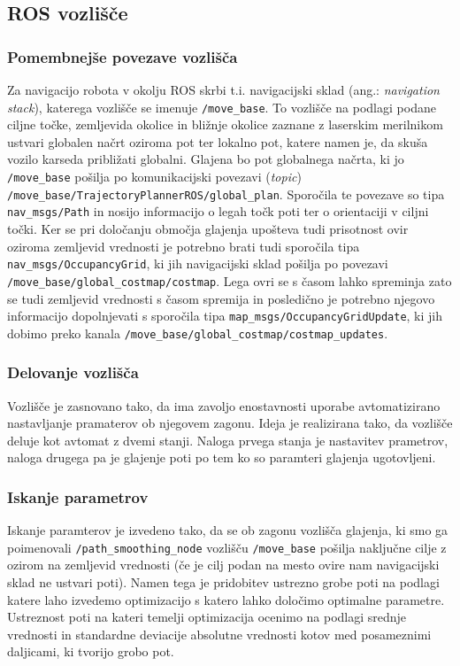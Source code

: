 \documentclass[10pt,a4paper]{article}
\begin{document}
\subsection{ROS vozlišče}

\subsubsection{Pomembnejše povezave vozlišča}


Za navigacijo robota v okolju ROS skrbi t.i. navigacijski sklad (ang.: \textit{navigation stack}), katerega vozlišče se imenuje \verb|/move_base|. To vozlišče na podlagi podane ciljne točke, zemljevida okolice in bližnje okolice zaznane z laserskim merilnikom ustvari globalen načrt oziroma pot ter lokalno pot, katere namen je, da skuša vozilo karseda približati globalni. Glajena bo pot globalnega načrta, ki jo \verb|/move_base| pošilja po komunikacijski povezavi (\textit{topic}) \verb|/move_base/TrajectoryPlannerROS/global_plan|. Sporočila te povezave so tipa \verb|nav_msgs/Path| in nosijo informacijo o legah točk poti ter o orientaciji v ciljni točki. Ker se pri določanju območja glajenja upošteva tudi prisotnost ovir oziroma zemljevid vrednosti je potrebno brati tudi sporočila tipa \verb|nav_msgs/OccupancyGrid|, ki jih navigacijski sklad pošilja po povezavi \verb|/move_base/global_costmap/costmap|. Lega ovri se s časom lahko spreminja zato se tudi zemljevid vrednosti s časom spremija in posledično je potrebno njegovo informacijo dopolnjevati s sporočila tipa \verb|map_msgs/OccupancyGridUpdate|, ki jih dobimo preko kanala
\verb|/move_base/global_costmap/costmap_updates|.

\subsubsection{Delovanje vozlišča}

Vozlišče je zasnovano tako, da ima zavoljo enostavnosti uporabe avtomatizirano nastavljanje pramaterov ob njegovem zagonu. Ideja je realizirana tako, da vozlišče deluje kot avtomat z dvemi stanji. Naloga prvega stanja je nastavitev prametrov, naloga drugega pa je glajenje poti po tem ko so paramteri glajenja ugotovljeni.

\subsubsection{Iskanje parametrov}

Iskanje paramterov je izvedeno tako, da se ob zagonu vozlišča glajenja, ki smo ga poimenovali \verb|/path_smoothing_node| vozlišču \verb|/move_base| pošilja naključne cilje z ozirom na zemljevid vrednosti (če je cilj podan na mesto ovire nam navigacijski sklad ne ustvari poti). Namen tega je pridobitev ustrezno grobe poti na podlagi katere laho izvedemo optimizacijo s katero lahko določimo optimalne parametre. Ustreznost poti na kateri temelji optimizacija ocenimo na podlagi srednje vrednosti in standardne deviacije absolutne vrednosti kotov med posameznimi daljicami, ki tvorijo grobo pot.
\end{document}
